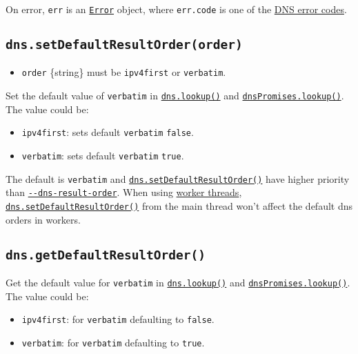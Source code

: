 On error, \texttt{err} is an
\href{errors.md\#class-error}{\texttt{Error}} object, where
\texttt{err.code} is one of the \hyperref[error-codes]{DNS error codes}.

\subsection{\texorpdfstring{\texttt{dns.setDefaultResultOrder(order)}}{dns.setDefaultResultOrder(order)}}\label{dns.setdefaultresultorderorder}

\begin{itemize}
\tightlist
\item
  \texttt{order} \{string\} must be
  \texttt{\textquotesingle{}ipv4first\textquotesingle{}} or
  \texttt{\textquotesingle{}verbatim\textquotesingle{}}.
\end{itemize}

Set the default value of \texttt{verbatim} in
\hyperref[dnslookuphostname-options-callback]{\texttt{dns.lookup()}} and
\hyperref[dnspromiseslookuphostname-options]{\texttt{dnsPromises.lookup()}}.
The value could be:

\begin{itemize}
\tightlist
\item
  \texttt{ipv4first}: sets default \texttt{verbatim} \texttt{false}.
\item
  \texttt{verbatim}: sets default \texttt{verbatim} \texttt{true}.
\end{itemize}

The default is \texttt{verbatim} and
\hyperref[dnssetdefaultresultorderorder]{\texttt{dns.setDefaultResultOrder()}}
have higher priority than
\href{cli.md\#--dns-result-orderorder}{\texttt{-\/-dns-result-order}}.
When using \href{worker_threads.md}{worker threads},
\hyperref[dnssetdefaultresultorderorder]{\texttt{dns.setDefaultResultOrder()}}
from the main thread won't affect the default dns orders in workers.

\subsection{\texorpdfstring{\texttt{dns.getDefaultResultOrder()}}{dns.getDefaultResultOrder()}}\label{dns.getdefaultresultorder}

Get the default value for \texttt{verbatim} in
\hyperref[dnslookuphostname-options-callback]{\texttt{dns.lookup()}} and
\hyperref[dnspromiseslookuphostname-options]{\texttt{dnsPromises.lookup()}}.
The value could be:

\begin{itemize}
\tightlist
\item
  \texttt{ipv4first}: for \texttt{verbatim} defaulting to
  \texttt{false}.
\item
  \texttt{verbatim}: for \texttt{verbatim} defaulting to \texttt{true}.
\end{itemize}

